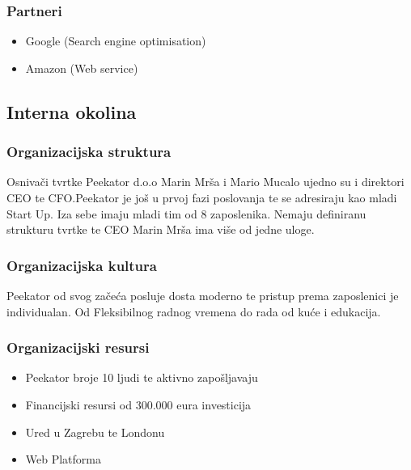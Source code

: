 \documentclass[a4paper]{article}
\begin{document}
	\subsubsection{Partneri}

	\begin{itemize}
		\item Google (Search engine optimisation)
		\item Amazon (Web service)
	\end{itemize}

	\subsection{Interna okolina }
	\subsubsection{Organizacijska  struktura  }

	Osnivači tvrtke Peekator d.o.o Marin Mrša i Mario Mucalo ujedno su i direktori CEO te CFO.Peekator je još u prvoj fazi poslovanja te se adresiraju kao mladi Start Up. Iza sebe imaju mladi tim od 8 zaposlenika. Nemaju definiranu strukturu tvrtke te CEO Marin Mrša ima više od jedne uloge.

	\subsubsection{Organizacijska  kultura }

	Peekator od svog začeća posluje dosta moderno te pristup prema zaposlenici je individualan. Od Fleksibilnog radnog vremena do rada od kuće i edukacija.

	\subsubsection{Organizacijski  resursi }

	\begin{itemize}
	\item Peekator broje 10 ljudi te aktivno zapošljavaju
	\item Financijski resursi od 300.000 eura investicija
	\item Ured u Zagrebu te Londonu
	\item Web Platforma
	\end{itemize}
\end{document}
